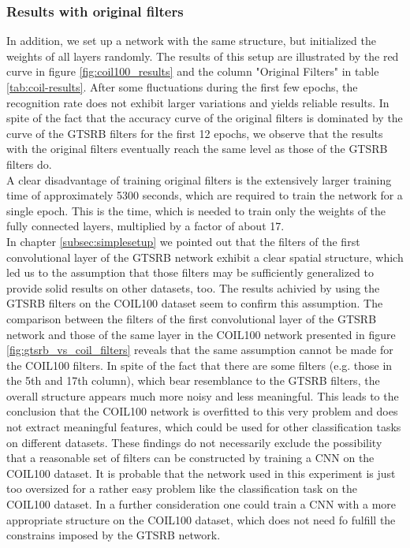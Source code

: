 \documentclass[11pt, a4paper]{article}
\begin{document}
\subsubsection{Results with original filters}

In addition, we set up a network with the same structure, but initialized the weights of all layers randomly. The results of this setup are illustrated by the red curve in figure \ref{fig:coil100_results} and the column "Original Filters" in table \ref{tab:coil-results}. After some fluctuations during the first few epochs, the recognition rate does not exhibit larger variations and yields reliable results. In spite of the fact that the accuracy curve of the original filters is dominated by the curve of the GTSRB filters for the first 12 epochs, we observe that the results with the original filters eventually reach the same level as those of the GTSRB filters do.\\
A clear disadvantage of training original filters is the extensively larger training time of approximately 5300 seconds, which are required to train the network for a single epoch. This is the time, which is needed to train only the weights of the fully connected layers, multiplied by a factor of about 17.\\
In chapter \ref{subsec:simplesetup} we pointed out that the filters of the first convolutional layer of the GTSRB network exhibit a clear spatial structure, which led us to the assumption that those filters may be sufficiently generalized to provide solid results on other datasets, too. The results achivied by using the GTSRB filters on the COIL100 dataset seem to confirm this assumption. The comparison between the filters of the first convolutional layer of the GTSRB network and those of the same layer in the COIL100 network presented in figure \ref{fig:gtsrb_vs_coil_filters} reveals that the same assumption cannot be made for the COIL100 filters. In spite of the fact that there are some filters (e.g. those in the 5th and 17th column), which bear resemblance to the GTSRB filters, the overall structure appears much more noisy and less meaningful. This leads to the conclusion that the COIL100 network is overfitted to this very problem and does not extract meaningful features, which could be used for other classification tasks on different datasets. These findings do not necessarily exclude the possibility that a reasonable set of filters can be constructed by training a CNN on the COIL100 dataset. It is probable that the network used in this experiment is just too oversized for a rather easy problem like the classification task on the COIL100 dataset. In a further consideration one could train a CNN with a more appropriate structure on the COIL100 dataset, which does not need fo fulfill the constrains imposed by the GTSRB network. 
\end{document}
